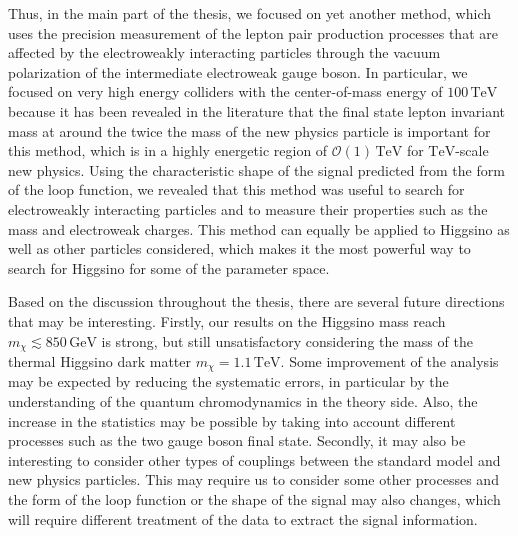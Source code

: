 \documentclass[12pt,twoside,book]{article}
\begin{document}
Thus, in the main part of the thesis, we focused on yet another method, which uses the precision measurement of the lepton pair production processes that are affected by the electroweakly interacting particles through the vacuum polarization of the intermediate electroweak gauge boson.
In particular, we focused on very high energy colliders with the center-of-mass energy of $100\,\mathrm{TeV}$ because it has been revealed in the literature that the final state lepton invariant mass at around the twice the mass of the new physics particle is important for this method, which is in a highly energetic region of $\mathcal{O}(1)\,\mathrm{TeV}$ for $\mathrm{TeV}$-scale new physics.
Using the characteristic shape of the signal predicted from the form of the loop function, we revealed that this method was useful to search for electroweakly interacting particles and to measure their properties such as the mass and electroweak charges.
This method can equally be applied to Higgsino as well as other particles considered, which makes it the most powerful way to search for Higgsino for some of the parameter space.

Based on the discussion throughout the thesis, there are several future directions that may be interesting.
Firstly, our results on the Higgsino mass reach $m_\chi \lesssim 850\, \mathrm{GeV}$ is strong, but still unsatisfactory considering the mass of the thermal Higgsino dark matter $m_\chi = 1.1\,\mathrm{TeV}$.
Some improvement of the analysis may be expected by reducing the systematic errors, in particular by the understanding of the quantum chromodynamics in the theory side.
Also, the increase in the statistics may be possible by taking into account different processes such as the two gauge boson final state.
Secondly, it may also be interesting to consider other types of couplings between the standard model and new physics particles.
This may require us to consider some other processes and the form of the loop function or the shape of the signal may also changes, which will require different treatment of the data to extract the signal information.


\clearpage


\begin{appendices}



\clearpage



\clearpage



\clearpage



\clearpage



\end{appendices}

\clearpage



\end{document}
